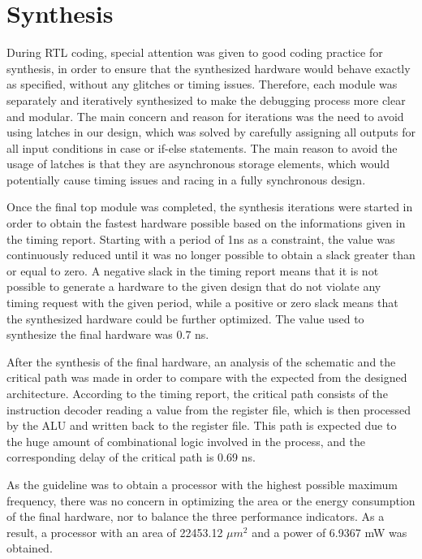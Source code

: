 \section{Synthesis}
\label{sec:synthesis}

During RTL coding, special attention was given to good coding practice for synthesis, in order to ensure that the synthesized hardware would behave exactly as specified, without any glitches or timing issues. Therefore, each module was separately and iteratively synthesized to make the debugging process more clear and modular. 
The main concern and reason for iterations was the need to avoid using latches in our design, which was solved by carefully assigning all outputs for all input conditions in case or if-else statements. The main reason to avoid the usage of latches is that they are asynchronous storage elements, which would potentially cause timing issues and racing in a fully synchronous design.

Once the final top module was completed, the synthesis iterations were started in order to obtain the fastest hardware possible based on the informations given in the timing report. Starting with a period of 1ns as a constraint, the value was continuously reduced until it was no longer possible to obtain a slack greater than or equal to zero. A negative slack in the timing report means that it is not possible to generate a hardware to the given design that do not violate any timing request with the given period, while a positive or zero slack means that the synthesized hardware could be further optimized.  The value used to synthesize the final hardware was 0.7 ns.

After the synthesis of the final hardware, an analysis of the schematic and the critical path was made in order to compare with the expected from the designed architecture. According to the timing report, the critical path consists of the instruction decoder reading a value from the register file, which is then processed by the ALU and written back to the register file. This path is expected due to the huge amount of combinational logic involved in the process, and the corresponding delay of the critical path is 0.69 ns.

As the guideline was to obtain a processor with the highest possible maximum frequency, there was no concern in optimizing the area or the energy consumption of the final hardware, nor to balance the three performance indicators. As a result, a processor with an area of 22453.12  $\mu m^{2}$ and a power of 6.9367 mW was obtained.
